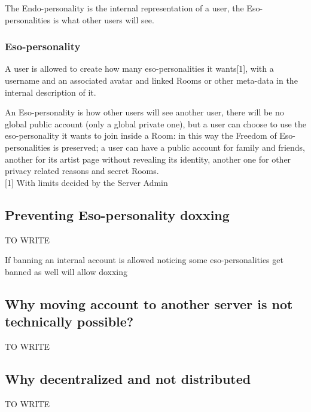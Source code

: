 \documentclass[12pt]{article}
\begin{document}
The Endo-personality is the internal representation of a user, the Eso-personalities is what other users will see.

\subsubsection*{Eso-personality}

A user is allowed to create how many eso-personalities it wants[1], with a username and an associated avatar and linked Rooms or other meta-data in the internal description of it.

An Eso-personality is how other users will see another user, there will be no global public account (only a global private one), but a user can choose to use the eso-personality it wants to join inside a Room: in this way the Freedom of Eso-personalities is preserved; a user can have a public account for family and friends, another for its artist page without revealing its identity, another one for other privacy related reasons and secret Rooms. \\

[1] With limits decided by the Server Admin

\subsection{Preventing Eso-personality doxxing}

TO WRITE

If banning an internal account is allowed noticing some eso-personalities get banned as well will allow doxxing

\subsection{Why moving account to another server is not technically possible?}

TO WRITE

\subsection{Why decentralized and not distributed}

TO WRITE


\end{document}
